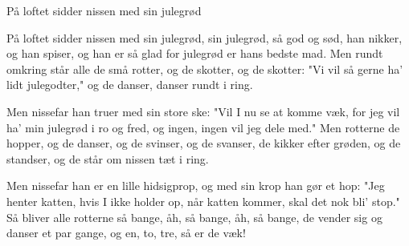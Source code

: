 \begin{sang}{På loftet sidder nissen med sin julegrød}{}
\begin{vers}
På loftet sidder nissen med sin julegrød,
sin julegrød, så god og sød,
han nikker, og han spiser, og han er så glad
for julegrød er hans bedste mad.
Men rundt omkring står alle de små rotter,
og de skotter, og de skotter:
"Vi vil så gerne ha' lidt julegodter,"
og de danser, danser rundt i ring.
\end{vers}
\begin{vers}
Men nissefar han truer med sin store ske:
"Vil I nu se at komme væk,
for jeg vil ha' min julegrød i ro og fred,
og ingen, ingen vil jeg dele med."
Men rotterne de hopper, og de danser,
og de svinser, og de svanser,
de kikker efter grøden, og de standser,
og de står om nissen tæt i ring.
\end{vers}
\begin{vers}
Men nissefar han er en lille hidsigprop,
og med sin krop han gør et hop:
"Jeg henter katten, hvis I ikke holder op,
når katten kommer, skal det nok bli' stop."
Så bliver alle rotterne så bange,
åh, så bange, åh, så bange,
de vender sig og danser et par gange,
og en, to, tre, så er de væk! 
\end{vers}
\laps
\end{sang}
